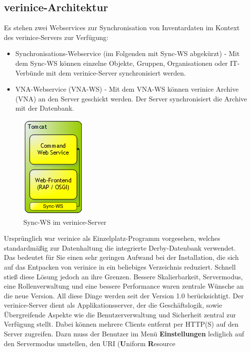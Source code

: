 \documentclass[a4paper,10pt]{book}
\begin{document}
\subsection{verinice-Architektur}
Es stehen zwei Webservices zur Synchronisation von Inventardaten im Kontext des verinice-Servers
zur Verfügung:
\begin{itemize}
 \item Synchronisations-Webservice (im Folgenden mit Sync-WS abgekürzt) - Mit dem Sync-WS können einzelne Objekte, Gruppen, Organisationen oder IT-Verbünde mit dem verinice-Server synchronisiert werden.
 \item VNA-Webservice (VNA-WS) - Mit dem VNA-WS können verinice Archive (VNA) an den Server geschickt werden. Der Server synchronisiert die Archive mit der Datenbank.
\end{itemize}
\begin{figure}[htb!]
  \centering
  \includegraphics[scale=.7]{Screenshot/Verinice_server_plus_ws.png}
  \caption{\label{Sync-WS im verinice-Server} Sync-WS im verinice-Server}
\end{figure}
\vspace{1cm}
Ursprünglich war verinice als Einzelplatz-Programm vorgesehen, welches standardmäßig zur Datenhaltung
die integrierte Derby-Datenbank verwendet. Das bedeutet für Sie einen sehr geringen Aufwand
bei der Installation, die sich auf das Entpacken von verinice in ein beliebiges Verzeichnis
reduziert. Schnell stieß diese Lösung jedoch an ihre Grenzen. Bessere Skalierbarkeit, Servermodus, eine
Rollenverwaltung und eine bessere Performance waren zentrale Wünsche an die neue Version. All diese
Dinge werden seit der Version 1.0 berücksichtigt.
\newline
Der verinice-Server dient als Applikationsserver, der die Geschäftslogik,
sowie Übergreifende Aspekte wie die Benutzerverwaltung und Sicherheit zentral zur Verfügung stellt.
Dabei können mehrere Clients entfernt per HTTP(S) auf den Server zugreifen. Dazu muss der Benutzer
im Menü \textbf{Einstellungen} lediglich auf den Servermodus umstellen, den URI (\textbf{U}niform \textbf{R}esource
\end{document}
